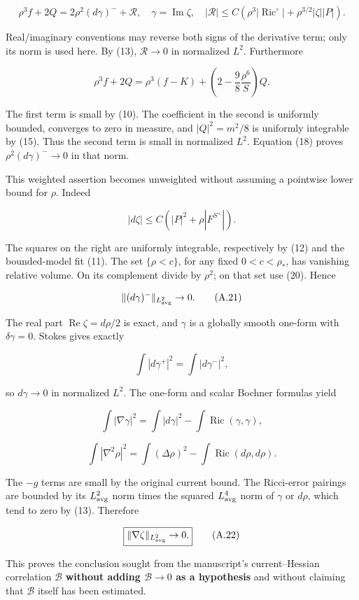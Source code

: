 \documentclass[11pt]{article}
\begin{document}
\[
 \rho^3 f+2Q=2\rho^2(d\gamma)^-+\mathcal R,
 \quad \gamma=\operatorname{Im}\zeta,
 \quad |\mathcal R|\le
 C(\rho^3|\operatorname{Ric}^{\circ}|+
              \rho^{3/2}|\zeta||P|).
\tag{A.18}
\]

Real/imaginary conventions may reverse both signs of the derivative
term; only its norm is used here. By (13), \(\mathcal R\to0\) in
normalized \(L^2\). Furthermore

\[
 \rho^3 f+2Q
 =\rho^3(f-K)+\left(2-\frac98\frac{\rho^6}{S}\right)Q.
\tag{A.19}
\]

The first term is small by (10). The coefficient in the second is
uniformly bounded, converges to zero in measure, and \(|Q|^2=m^2/8\) is
uniformly integrable by (15). Thus the second term is small in
normalized \(L^2\). Equation (18) proves \(\rho^2(d\gamma)^-\to0\) in
that norm.

This weighted assertion becomes unweighted without assuming a pointwise
lower bound for \(\rho\). Indeed

\[
 |d\zeta|\le C(|P|^2+\rho|F^{S^+}|).
\tag{A.20}
\]

The squares on the right are uniformly integrable, respectively by (12)
and the bounded-model fit (11). The set \(\{\rho<c\}\), for any fixed
\(0<c<\rho_*\), has vanishing relative volume. On its complement divide
by \(\rho^2\); on that set use (20). Hence

\[
 \|(d\gamma)^-\|_{L^2_{\rm avg}}\to0.
\tag{A.21}
\]

The real part \(\operatorname{Re}\zeta=d\rho/2\) is exact, and
\(\gamma\) is a globally smooth one-form with \(\delta\gamma=0\). Stokes
gives exactly

\[
 \int|d\gamma^+|^2=\int|d\gamma^-|^2,
\]

so \(d\gamma\to0\) in normalized \(L^2\). The one-form and scalar
Bochner formulas yield

\[
 \int|\nabla\gamma|^2
 =\int|d\gamma|^2-\int\operatorname{Ric}(\gamma,\gamma),
\]

\[
 \int|\nabla^2\rho|^2
 =\int(\Delta\rho)^2-\int\operatorname{Ric}(d\rho,d\rho).
\]

The \(-g\) terms are small by the original current bound. The
Ricci-error pairings are bounded by its \(L^2_{\rm avg}\) norm times the
squared \(L^4_{\rm avg}\) norm of \(\gamma\) or \(d\rho\), which tend to
zero by (13). Therefore

\[
 \boxed{\|\nabla\zeta\|_{L^2_{\rm avg}}\to0.}\tag{A.22}
\]

This proves the conclusion sought from the manuscript's current--Hessian
correlation \(\mathcal B\) \textbf{without adding \(\mathcal B\to0\) as
a hypothesis} and without claiming that \(\mathcal B\) itself has been
estimated.
\end{document}
